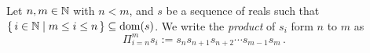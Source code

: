\guard



\begin{defn}
\label{defn:productOfSequence}
  Let $n,m\in\mathbb{N}$ with $n<m$, and $s$ be a sequence of reals such that $\left\{\,i\in\mathbb{N}\mid m\leq i\leq n\,\right\}\subseteq \mathrm{dom}(s)$.
  We write the \emph{product} of $s_i$ form $n$ to $m$ as \[ \Pi_{i=n}^m s_i := s_n s_{n+1} s_{n+2} \cdots s_{m-1} s_m\,.\]
\end{defn}
